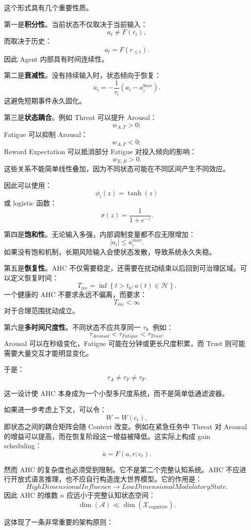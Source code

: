 这个形式具有几个重要性质。

第一是\textbf{积分性}。当前状态不仅取决于当前输入：
\[
a_t\neq F(r_t),
\]
而取决于历史：
\[
a_t
=
F(r_{\leq t}).
\]
因此 Agent 内部具有时间连续性。

第二是\textbf{衰减性}。没有持续输入时，状态倾向于恢复：
\[
\dot a_i
=
-\frac{1}{\tau_i}
(a_i-a_i^{base}).
\]
这避免短期事件永久固化。

第三是\textbf{状态耦合}。例如 Threat 可以提升 Arousal：
\[
w_{A,T}>0;
\]
Fatigue 可以抑制 Arousal：
\[
w_{A,F}<0;
\]
Reward Expectation 可以抵消部分 Fatigue 对投入倾向的影响：
\[
w_{E,R}>0.
\]
这些关系不能简单线性叠加，因为不同状态可能在不同区间产生不同效应。

因此可以使用：
\[
\phi_i(z)
=
\tanh(z)
\]
或 logistic 函数：
\[
\sigma(z)=\frac{1}{1+e^{-z}}.
\]

第四是\textbf{饱和性}。无论输入多强，内部调制变量都不应无限增加：
\[
|a_i|\leq a_i^{max}.
\]
如果没有饱和机制，长期风险输入会使状态发散，导致系统永久失稳。

第五是\textbf{恢复性}。AHC 不仅需要稳定，还需要在扰动结束以后回到可治理区域。可以定义恢复时间：
\[
T_{\mathrm{rec}}
=
\inf
\left\{
t>t_0:
a(t)\in\mathcal H
\right\}.
\]
一个健康的 AHC 不要求永远不偏离，而要求：
\[
T_{\mathrm{rec}}<\infty
\]
对于合理范围扰动成立。

第六是\textbf{多时间尺度性}。不同状态不应共享同一 \(\tau\)。例如：
\[
\tau_{Arousal}
<
\tau_{Fatigue}
<
\tau_{Trust}.
\]
Arousal 可以在秒级变化，Fatigue 可能在分钟或更长尺度积累，而 Trust 则可能需要大量交互才能明显变化。

于是：
\[
\boxed{
\tau_A\neq\tau_F\neq\tau_T.
}
\]

这一设计使 AHC 本身成为一个小型多尺度系统，而不是简单低通滤波器。

如果进一步考虑上下文，可以令：
\[
W=W(c_t),
\]
即状态之间的耦合矩阵会随 Context 改变。例如在紧急任务中 Threat 对 Arousal 的增益可以提高，而在恢复阶段这一增益被降低。这实际上构成 gain scheduling：
\[
\dot a
=
F(a,r;c_t).
\]

然而 AHC 的复杂度也必须受到限制。它不是第二个完整认知系统。AHC 不应进行开放式语言推理，也不应自行构造庞大世界模型。它的作用是：
\[
HighDimensionalInfluence
\rightarrow
LowDimensionalModulatoryState.
\]
因此 AHC 的维数 \(n\) 应远小于完整认知状态空间：
\[
\dim(\mathcal A)
\ll
\dim(\mathcal X_{\mathrm{cognitive}}).
\]

这体现了一条非常重要的架构原则：
\begin{statementbox}
\centering
{}
\end{statementbox}

